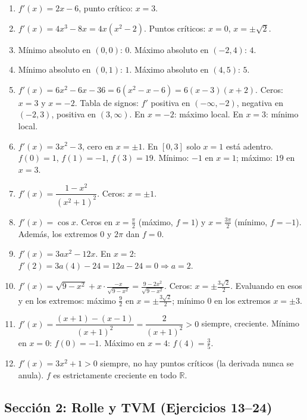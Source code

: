 \documentclass[12pt, letterpaper]{article}
\begin{document}
  \begin{enumerate}[series=respuestas, leftmargin=*, label=\textbf{\arabic*.}]
    \item $f'(x) = 2x - 6$, punto crítico: $x = 3$.
    \item $f'(x) = 4x^3 - 8x = 4x(x^2 - 2)$. Puntos críticos: $x = 0$, $x = \pm\sqrt{2}$.
    \item Mínimo absoluto en $(0, 0)$: $0$. Máximo absoluto en $(-2, 4)$: $4$.
    \item Mínimo absoluto en $(0, 1)$: $1$. Máximo absoluto en $(4, 5)$: $5$.
    \item $f'(x) = 6x^2 - 6x - 36 = 6(x^2 - x - 6) = 6(x - 3)(x + 2)$. Ceros: $x = 3$ y $x = -2$. Tabla de signos: $f'$ positiva en $(-\infty, -2)$, negativa en $(-2, 3)$, positiva en $(3, \infty)$. En $x = -2$: máximo local. En $x = 3$: mínimo local.
    \item $f'(x) = 3x^2 - 3$, cero en $x = \pm 1$. En $[0, 3]$ solo $x = 1$ está adentro. $f(0) = 1$, $f(1) = -1$, $f(3) = 19$. Mínimo: $-1$ en $x = 1$; máximo: $19$ en $x = 3$.
    \item $f'(x) = \dfrac{1 - x^2}{(x^2 + 1)^2}$. Ceros: $x = \pm 1$.
    \item $f'(x) = \cos x$. Ceros en $x = \frac{\pi}{2}$ (máximo, $f = 1$) y $x = \frac{3\pi}{2}$ (mínimo, $f = -1$). Además, los extremos $0$ y $2\pi$ dan $f = 0$.
    \item $f'(x) = 3ax^2 - 12x$. En $x = 2$: $f'(2) = 3a(4) - 24 = 12a - 24 = 0 \Rightarrow a = 2$.
    \item $f'(x) = \sqrt{9 - x^2} + x \cdot \frac{-x}{\sqrt{9-x^2}} = \frac{9 - 2x^2}{\sqrt{9-x^2}}$. Ceros: $x = \pm \frac{3\sqrt{2}}{2}$. Evaluando en esos y en los extremos: máximo $\frac{9}{2}$ en $x = \pm \frac{3\sqrt{2}}{2}$; mínimo $0$ en los extremos $x = \pm 3$.
    \item $f'(x) = \dfrac{(x + 1) - (x - 1)}{(x + 1)^2} = \dfrac{2}{(x + 1)^2} > 0$ siempre, creciente. Mínimo en $x = 0$: $f(0) = -1$. Máximo en $x = 4$: $f(4) = \frac{3}{5}$.
    \item $f'(x) = 3x^2 + 1 > 0$ siempre, no hay puntos críticos (la derivada nunca se anula). $f$ es estrictamente creciente en todo $\mathbb{R}$.
  \end{enumerate}


  \subsection*{Sección 2: Rolle y TVM (Ejercicios 13--24)}
\end{document}
